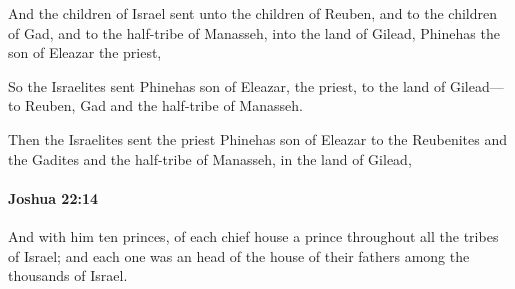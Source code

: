 			\begin{versebox}
					\item[BHS] 
					\item[ASV] And the children of Israel sent unto the children of Reuben, and to the children of Gad, and to the half-tribe of Manasseh, into the land of Gilead, Phinehas the son of Eleazar the priest,
					\item[NIV] So the Israelites sent Phinehas son of Eleazar, the priest, to the land of Gilead—to Reuben, Gad and the half-tribe of Manasseh.
					\item[NRSV] Then the Israelites sent the priest Phinehas son of Eleazar to the Reubenites and the Gadites and the half-tribe of Manasseh, in the land of Gilead,
			\end{versebox}

		\paragraph{Joshua 22:14} %
			\label{JOSHUA-22-14}

			And with him ten princes, of each chief house a prince throughout all the tribes of Israel; and each one was an head of the house of their fathers among the thousands of Israel.

